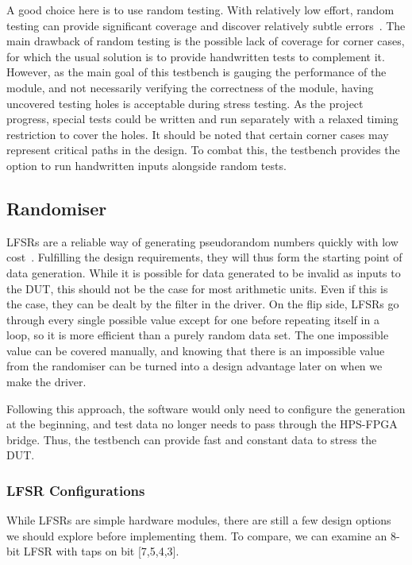 A good choice here is to use random testing.
With relatively low effort, random testing can provide significant coverage and discover relatively subtle errors~\cite{Duran1}.
The main drawback of random testing is the possible lack of coverage for corner cases, for which the usual solution is to provide handwritten tests to complement it.
However, as the main goal of this testbench is gauging the performance of the module, and not necessarily verifying the correctness of the module, having uncovered testing holes is acceptable during stress testing.
As the project progress, special tests could be written and run separately with a relaxed timing restriction to cover the holes.
It should be noted that certain corner cases may represent critical paths in the design.
To combat this, the testbench provides the option to run handwritten inputs alongside random tests.

\subsection{Randomiser}

LFSRs are a reliable way of generating pseudorandom numbers quickly with low cost~\cite{Hazwani1}.
Fulfilling the design requirements, they will thus form the starting point of data generation.
While it is possible for data generated to be invalid as inputs to the DUT, this should not be the case for most arithmetic units.
Even if this is the case, they can be dealt by the filter in the driver.
On the flip side, LFSRs go through every single possible value except for one before repeating itself in a loop, so it is more efficient than a purely random data set.
The one impossible value can be covered manually, and knowing that there is an impossible value from the randomiser can be turned into a design advantage later on when we make the driver.

Following this approach, the software would only need to configure the generation at the beginning, and test data no longer needs to pass through the HPS-FPGA bridge.
Thus, the testbench can provide fast and constant data to stress the DUT.

\subsubsection{LFSR Configurations}

While LFSRs are simple hardware modules, there are still a few design options we should explore before implementing them.
To compare, we can examine an 8-bit LFSR with taps on bit [7,5,4,3].

